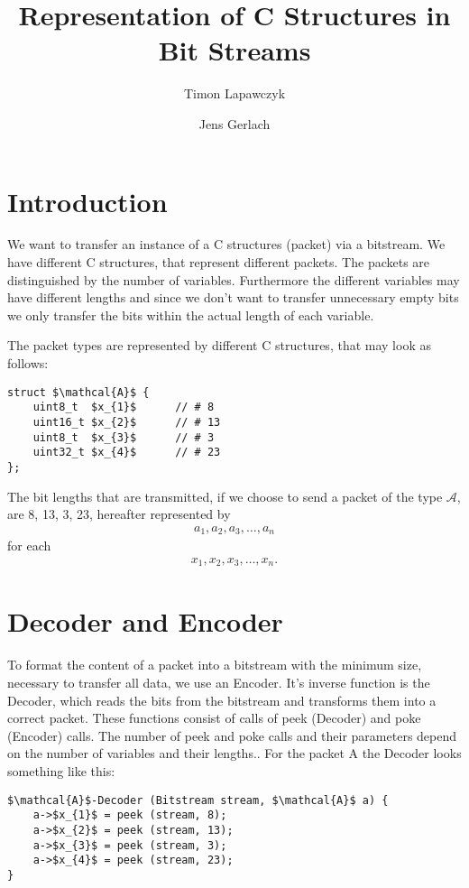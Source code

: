 \documentclass[paper=a4,DIV=12]{scrartcl}
\title{Representation of C Structures in Bit Streams}
\author{Timon Lapawczyk \and Jens Gerlach}
\begin{document}
\maketitle

\section{Introduction}

We want to transfer an instance of a C structures (packet) via a bitstream.
We have different C structures, that represent different packets.
The packets are distinguished by the number of variables.
Furthermore the different variables may have different lengths and
since we don't want to transfer unnecessary empty bits we only transfer
the bits within the actual length of each variable.

The packet types are represented by different C structures, that may look as follows:

\begin{lstlisting}[mathescape]
struct $\mathcal{A}$ {
	uint8_t  $x_{1}$      // # 8
	uint16_t $x_{2}$      // # 13
	uint8_t  $x_{3}$      // # 3
	uint32_t $x_{4}$      // # 23
};
\end{lstlisting}

The bit lengths that are transmitted, if we choose to send a packet of the type $\mathcal{A}$, are 8, 13, 3, 23, hereafter represented by 
\begin{align*}
	a_{1}, a_{2}, a_{3}, \ldots , a_{n}
\end{align*}
for each
\begin{align*}
	x_{1}, x_{2}, x_{3}, \ldots , x_{n}.
\end{align*}

\section{Decoder and Encoder}

To format the content of a packet into a bitstream with the minimum size, necessary to transfer all data, we use an Encoder.
It's inverse function is the Decoder, which reads the bits
from the bitstream and transforms them into a correct packet.
These functions consist of calls of peek (Decoder) and poke (Encoder) calls.
The number of peek and poke calls and their parameters depend on the number of variables and their lengths..
For the packet A the Decoder looks something like this:

\begin{lstlisting}[mathescape]
$\mathcal{A}$-Decoder (Bitstream stream, $\mathcal{A}$ a) {
	a->$x_{1}$ = peek (stream, 8);
	a->$x_{2}$ = peek (stream, 13);
	a->$x_{3}$ = peek (stream, 3);
	a->$x_{4}$ = peek (stream, 23);
}
\end{lstlisting}
\end{document}
